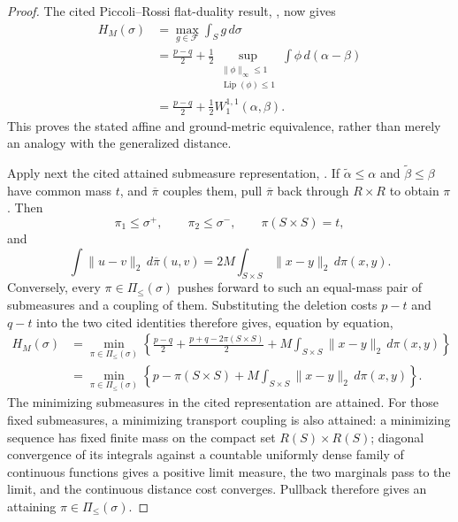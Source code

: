 \documentclass{article}
\begin{document}
\begin{proof}
The cited Piccoli--Rossi flat-duality result, \cite[Definition 12 and Theorem 13]{PiccoliRossi2016GeneralizedWasserstein}, now gives
\[
\begin{aligned}
 H_M(\sigma)
 &=\max_{g\in\mathcal F}\int_S g\,d\sigma\\
 &=\frac{p-q}{2}
   +\frac12\sup_{\substack{\lVert\phi\rVert_\infty\leq1\\
                             \operatorname{Lip}(\phi)\leq1}}
       \int \phi\,d(\alpha-\beta)\\
 &=\frac{p-q}{2}+\frac12W_1^{1,1}(\alpha,\beta).
\end{aligned}
\]
This proves the stated affine and ground-metric equivalence, rather than merely an analogy with the generalized distance.

Apply next the cited attained submeasure representation, \cite[Definition 3 and Proposition 4]{PiccoliRossi2016GeneralizedWasserstein}.  If \(\widetilde\alpha\leq\alpha\) and \(\widetilde\beta\leq\beta\) have common mass \(t\), and \(\overline\pi\) couples them, pull \(\overline\pi\) back through \(R\times R\) to obtain \(\pi\).  Then
\[
 \pi_1\leq\sigma^+,
 \qquad
 \pi_2\leq\sigma^-,
 \qquad
 \pi(S\times S)=t,
\]
and
\[
 \int\lVert u-v\rVert_2\,d\overline\pi(u,v)
 =2M\int_{S\times S}\lVert x-y\rVert_2\,d\pi(x,y).
\]
Conversely, every \(\pi\in\Pi_{\leq}(\sigma)\) pushes forward to such an equal-mass pair of submeasures and a coupling of them.  Substituting the deletion costs \(p-t\) and \(q-t\) into the two cited identities therefore gives, equation by equation,
\[
\begin{aligned}
 H_M(\sigma)
 &=\min_{\pi\in\Pi_{\leq}(\sigma)}
   \left\{
      \frac{p-q}{2}+\frac{p+q-2\pi(S\times S)}{2}
      +M\int_{S\times S}\lVert x-y\rVert_2\,d\pi(x,y)
   \right\}\\
 &=\min_{\pi\in\Pi_{\leq}(\sigma)}
   \left\{
      p-\pi(S\times S)
      +M\int_{S\times S}\lVert x-y\rVert_2\,d\pi(x,y)
   \right\}.
\end{aligned}
\]
The minimizing submeasures in the cited representation are attained.  For those fixed submeasures, a minimizing transport coupling is also attained: a minimizing sequence has fixed finite mass on the compact set \(R(S)\times R(S)\); diagonal convergence of its integrals against a countable uniformly dense family of continuous functions gives a positive limit measure, the two marginals pass to the limit, and the continuous distance cost converges.  Pullback therefore gives an attaining \(\pi\in\Pi_{\leq}(\sigma)\).


\end{proof}
\end{document}
